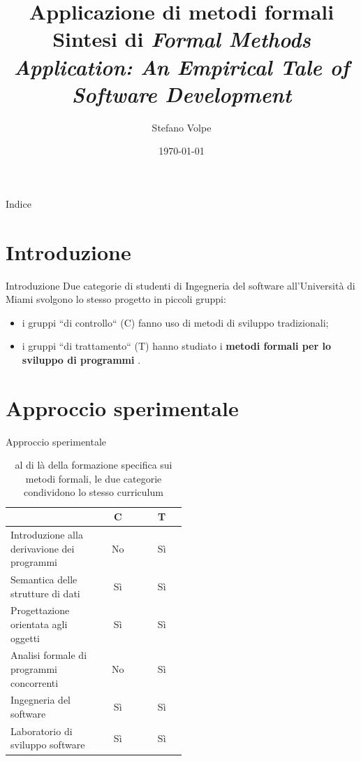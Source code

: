 \documentclass{beamer}
\title{
	Applicazione di metodi formali \\
	\small Sintesi di  \emph{Formal Methods Application: An Empirical Tale of
		Software Development} \autocite{sobel}
}
\author{Stefano Volpe}
\institute{Università di Bologna}
\date{\today}
\begin{document}
\begin{frame}
	\titlepage
\end{frame}

\begin{frame}{Indice}
	\tableofcontents
\end{frame}

\section{Introduzione}
\begin{frame}{Introduzione}
	Due categorie di studenti di Ingegneria del software all'Università di Miami
	svolgono lo stesso progetto in piccoli gruppi:
	\begin{itemize}
		\item i gruppi ``di controllo`` (C) fanno uso di metodi di sviluppo
		      tradizionali;
		\item i gruppi ``di trattamento`` (T) hanno studiato i \textbf{metodi
			      formali per lo sviluppo di programmi} \autocite{cohen}.
	\end{itemize}
\end{frame}

\section{Approccio sperimentale}
\begin{frame}{Approccio sperimentale}
	\begin{table}
		\begin{tabular}{|p{0.5\linewidth}|c|c|}
			\hline
			                                            & C  & T  \\
			\hline
			Introduzione alla derivavione dei programmi & No & Sì \\
			\hline
			Semantica delle strutture di dati           & Sì & Sì \\
			\hline
			Progettazione orientata agli oggetti        & Sì & Sì \\
			\hline
			Analisi formale di programmi concorrenti    & No & Sì \\
			\hline
			Ingegneria del software                     & Sì & Sì \\
			\hline
			Laboratorio di sviluppo software            & Sì & Sì \\
			\hline
		\end{tabular}
		\caption{al di là della formazione specifica sui metodi formali, le due
			categorie condividono lo stesso curriculum}
	\end{table}

\end{frame}
\end{document}
